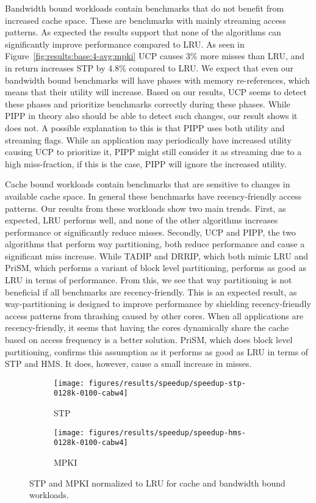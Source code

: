 Bandwidth bound workloads contain benchmarks that do not benefit from increased cache space.
These are benchmarks with mainly streaming access patterns. 
As expected the results support that none of the algorithms can significantly improve performance compared to LRU.
As seen in Figure~\ref{fig:results:base:4-avg:mpki} UCP causes 3\% more misses than LRU, and in return increases STP by 4.8\% compared to LRU.
We expect that even our bandwidth bound benchmarks will have phases with memory re-references, which means that their utility will increase.
Based on our results, UCP seems to detect these phases and prioritize benchmarks correctly during these phases.
While PIPP in theory also should be able to detect such changes, our result shows it does not.
A possible explanation to this is that PIPP uses both utility and streaming flags.
While an application may periodically have increased utility causing UCP to prioritize it, PIPP might still consider it as streaming due to a high miss-fraction, if this is the case, PIPP will ignore the increased utility.

Cache bound workloads contain benchmarks that are sensitive to changes in available cache space.
In general these benchmarks have recency-friendly access patterns.
Our results from these workloads show two main trends.
First, as expected, LRU performs well, and none of the other algorithms increases performance or significantly reduce misses.
Secondly, UCP and PIPP, the two algorithms that perform way partitioning, both reduce performance and cause a significant miss increase. 
While TADIP and DRRIP, which both mimic LRU and PriSM, which performs a variant of block level partitioning, performs as good as LRU in terms of performance.
From this, we see that way partitioning is not beneficial if all benchmarks are recency-friendly.
This is an expected result, as way-partitioning is designed to improve performance by shielding recency-friendly access patterns from thrashing caused by other cores.
When all applications are recency-friendly, it seems that having the cores dynamically share the cache based on access frequency is a better solution.
PriSM, which does block level partitioning, confirms this assumption as it performs as good as LRU in terms of STP and HMS.
It does, however, cause a small increase in misses.


\begin{figure}[th]
    \centering
    \begin{subfigure}[b]{0.6\textwidth}
        \texttt{[image: figures/results/speedup/speedup-stp-0128k-0100-cabw4]}
        \caption{STP}
        \label{fig:results:base:cabw:stp}
    \end{subfigure}
    \begin{subfigure}[b]{0.6\textwidth}
        \texttt{[image: figures/results/speedup/speedup-hms-0128k-0100-cabw4]}
        \caption{MPKI}
        \label{fig:results:base:cabw:mpki}
    \end{subfigure}
    \caption[cabw workloads result]{STP and MPKI normalized to LRU for cache and bandwidth bound workloads.}
    \label{fig:results:base:cabw} 
\end{figure}


